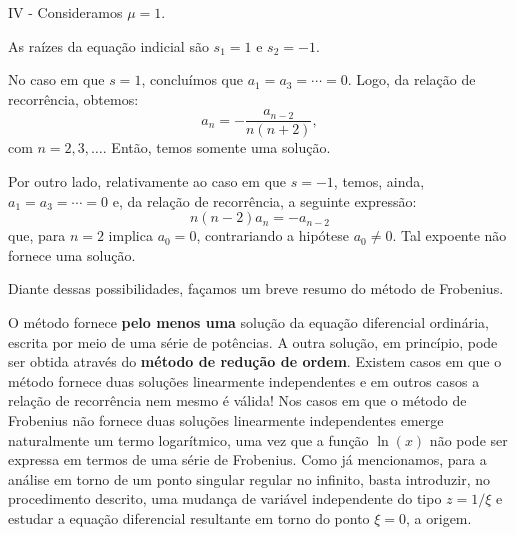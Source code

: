 {IV - Consideramos $\mu = 1$.

As raízes da equação indicial são $s_1 = 1$ e $s_{2} = -1$.

No caso em que $s = 1$, concluímos que $a_{1} = a_3 = \cdots = 0$. Logo, da relação de recorrência, obtemos:
$$a_n = - \dfrac{a_{n-2}}{n(n+2)},$$
com $n = 2, 3, \ldots$. Então, temos somente uma solução.


Por outro lado, relativamente ao caso em que $s = -1$, temos, ainda, $a_{1} = a_3 = \cdots = 0$ e, da relação de recorrência, a seguinte expressão:
$$n(n - 2)a_n = -a_{n-2}$$
que, para $n = 2$ implica $a_{0} = 0$, contrariando a hipótese $a_{0} \ne 0$. Tal expoente não fornece uma solução.


Diante dessas possibilidades, façamos um breve resumo do método de Frobenius.

O método fornece \textbf{pelo menos uma} solução da equação diferencial ordinária, escrita por meio de uma série de potências. A outra solução, em princípio, pode ser obtida através do \textbf{método de redução de ordem}. Existem casos em que o método fornece duas soluções linearmente independentes e em outros casos a relação de recorrência nem mesmo é válida! Nos casos em que o método de Frobenius não fornece duas soluções linearmente independentes emerge naturalmente um termo logarítmico, uma vez que a função $\ln(x)$ não pode ser expressa em termos de uma série de Frobenius. Como já mencionamos, para a análise em torno de um ponto singular regular no infinito, basta introduzir, no procedimento descrito, uma mudança de variável independente do tipo $z = 1/\xi$ e estudar a equação diferencial resultante em torno do ponto $\xi = 0$, a origem.
}

